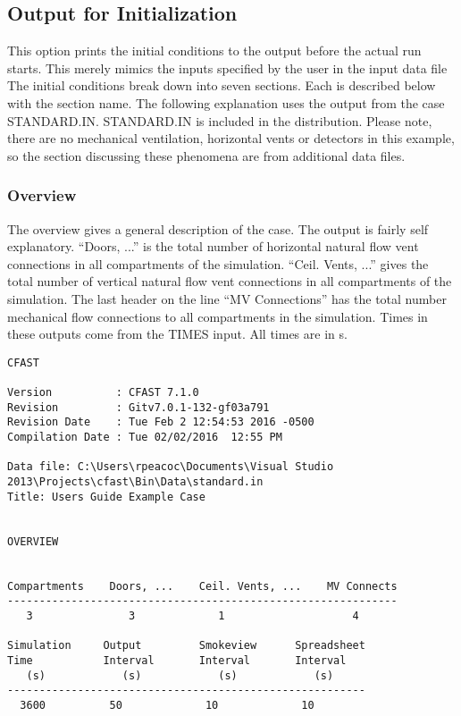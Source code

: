 \subsection{Output for Initialization}

This option prints the initial conditions to the output before the actual run starts.  This merely mimics the inputs specified by the user in the input data file  The initial conditions break down into seven sections.  Each is described below with the section name. The following explanation uses the output from the case STANDARD.IN. STANDARD.IN is included in the distribution. Please note, there are no mechanical ventilation, horizontal vents or detectors in this example, so the section discussing these phenomena are from additional data files.

\subsubsection{Overview}

The overview gives a general description of the case.  The output is fairly self explanatory. ``Doors, ...'' is the total number of horizontal natural flow vent connections in all compartments of the simulation.  ``Ceil. Vents, ...'' gives the total number of vertical natural flow vent connections in all compartments of the simulation.  The last header on the line ``MV Connections'' has the total number mechanical flow connections to all compartments in the simulation. Times in these outputs come from the TIMES input. All times are in s.
\begin{lstlisting}[basicstyle=\tiny]
CFAST

Version          : CFAST 7.1.0
Revision         : Gitv7.0.1-132-gf03a791
Revision Date    : Tue Feb 2 12:54:53 2016 -0500
Compilation Date : Tue 02/02/2016  12:55 PM

Data file: C:\Users\rpeacoc\Documents\Visual Studio 2013\Projects\cfast\Bin\Data\standard.in
Title: Users Guide Example Case


OVERVIEW


Compartments    Doors, ...    Ceil. Vents, ...    MV Connects
-------------------------------------------------------------
   3               3             1                    4

Simulation     Output         Smokeview      Spreadsheet
Time           Interval       Interval       Interval
   (s)            (s)            (s)            (s)
--------------------------------------------------------
  3600          50             10             10
\end{lstlisting}

